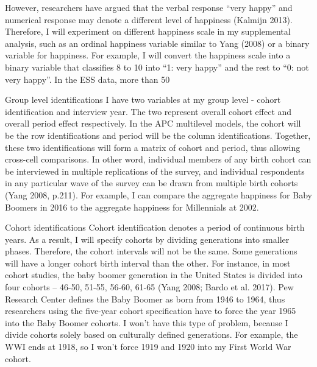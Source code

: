 However, researchers have argued that the verbal response “very happy” and numerical response may denote a different level of happiness (Kalmijn 2013). Therefore, I will experiment on different happiness scale in my supplemental analysis, such as an ordinal happiness variable similar to Yang (2008) or a binary variable for happiness. For example, I will convert the happiness scale into a binary variable that classifies 8 to 10 into “1: very happy” and the rest to “0: not very happy”. In the ESS data, more than 50%

Group level identifications
I have two variables at my group level - cohort identification and interview year. The two represent overall cohort effect and overall period effect respectively. In the APC multilevel models, the cohort will be the row identifications and period will be the column identifications. Together, these two identifications will form a matrix of cohort and period, thus allowing cross-cell comparisons. In other word, individual members of any birth cohort can be interviewed in multiple replications of the survey, and individual respondents in any particular wave of the survey can be drawn from multiple birth cohorts (Yang 2008, p.211). For example, I can compare the aggregate happiness for Baby Boomers in 2016 to the aggregate happiness for Millennials at 2002.

Cohort identifications
Cohort identification denotes a period of continuous birth years. As a result, I will specify cohorts by dividing generations into smaller phases. Therefore, the cohort intervals will not be the same. Some generations will have a longer cohort birth interval than the other. For instance, in most cohort studies, the baby boomer generation in the United States is divided into four cohorts – 46-50, 51-55, 56-60, 61-65 (Yang 2008; Bardo et al. 2017). Pew Research Center defines the Baby Boomer as born from 1946 to 1964, thus researchers using the five-year cohort specification have to force the year 1965 into the Baby Boomer cohorts. I won’t have this type of problem, because I divide cohorts solely based on culturally defined generations. For example, the WWI ends at 1918, so I won’t force 1919 and 1920 into my First World War cohort.

